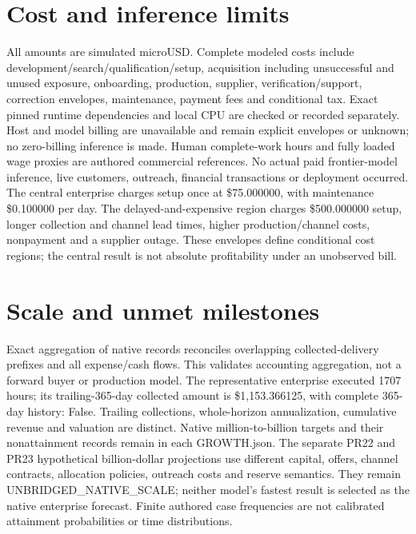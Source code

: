 \documentclass[10pt,letterpaper]{article}
\begin{document}
\section{Cost and inference limits}
All amounts are simulated microUSD. Complete modeled costs include development/search/qualification/setup, acquisition including unsuccessful and unused exposure, onboarding, production, supplier, verification/support, correction envelopes, maintenance, payment fees and conditional tax. Exact pinned runtime dependencies and local CPU are checked or recorded separately. Host and model billing are unavailable and remain explicit envelopes or unknown; no zero-billing inference is made. Human complete-work hours and fully loaded wage proxies are authored commercial references. No actual paid frontier-model inference, live customers, outreach, financial transactions or deployment occurred. The central enterprise charges setup once at \$75.000000, with maintenance \$0.100000 per day. The delayed-and-expensive region charges \$500.000000 setup, longer collection and channel lead times, higher production/channel costs, nonpayment and a supplier outage. These envelopes define conditional cost regions; the central result is not absolute profitability under an unobserved bill.
\section{Scale and unmet milestones}
Exact aggregation of native records reconciles overlapping collected-delivery prefixes and all expense/cash flows. This validates accounting aggregation, not a forward buyer or production model. The representative enterprise executed 1707 hours; its trailing-365-day collected amount is \$1,153.366125, with complete 365-day history: False. Trailing collections, whole-horizon annualization, cumulative revenue and valuation are distinct. Native million-to-billion targets and their nonattainment records remain in each GROWTH.json. The separate PR22 and PR23 hypothetical billion-dollar projections use different capital, offers, channel contracts, allocation policies, outreach costs and reserve semantics. They remain UNBRIDGED\_\allowbreak{}NATIVE\_\allowbreak{}SCALE; neither model's fastest result is selected as the native enterprise forecast. Finite authored case frequencies are not calibrated attainment probabilities or time distributions.
\end{document}
